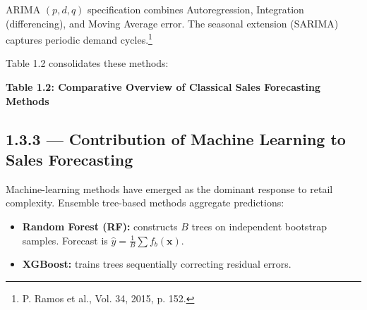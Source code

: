 \documentclass[12pt,a4paper,oneside]{report}
\begin{document}
ARIMA $(p, d, q)$ specification combines Autoregression, Integration (differencing), and Moving Average error. The seasonal extension (SARIMA) captures periodic demand cycles.\footnote{P. Ramos et al., Vol. 34, 2015, p. 152.}

Table 1.2 consolidates these methods:

\begin{table}[h!]
\centering
{\bfseries Table 1.2: Comparative Overview of Classical Sales Forecasting Methods}\\[6pt]
\renewcommand{\arraystretch}{1.65}
\end{table}

\subsection{1.3.3 — Contribution of Machine Learning to Sales Forecasting}
\label{subsec:1.3.3}

Machine-learning methods have emerged as the dominant response to retail complexity.
Ensemble tree-based methods aggregate predictions:
\begin{itemize}
    \item \textbf{Random Forest (RF):} constructs $B$ trees on independent bootstrap samples. Forecast is $\hat{y} = \frac{1}{B}\sum f_b(\mathbf{x})$.
    \item \textbf{XGBoost:} trains trees sequentially correcting residual errors.
\end{itemize}
\end{document}
